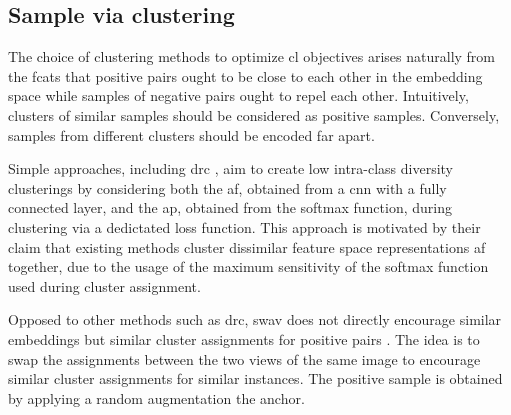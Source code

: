 \subsection{Sample via clustering}
\label{subsec:SampleViaClustering}

The choice of clustering methods to optimize \ac{cl} objectives 
arises naturally from the fcats that positive pairs ought to be close to each other in the embedding space 
while samples of negative pairs ought to repel each other.
Intuitively, clusters of similar samples should be considered as positive samples.
Conversely, samples from different clusters should be encoded far apart.

Simple approaches, including \ac{drc} \citet{DRC_2020}, aim to create low intra-class diversity clusterings 
by considering both the \ac{af}, obtained from a \ac{cnn} with a fully connected layer, 
and the \ac{ap}, obtained from the softmax function, during clustering via a dedictated loss function.
This approach is motivated by their claim that existing methods cluster dissimilar feature space 
representations \ac{af} together,
due to the usage of the maximum sensitivity of the softmax function used during cluster assignment.

Opposed to other methods such as \ac{drc}, \ac{swav} does not directly encourage similar embeddings but similar 
cluster assignments for positive pairs \citet{swav_2020}.
The idea is to swap the assignments between the two views of the same image to encourage 
similar cluster assignments for similar instances.
The positive sample is obtained by applying a random augmentation the anchor.





